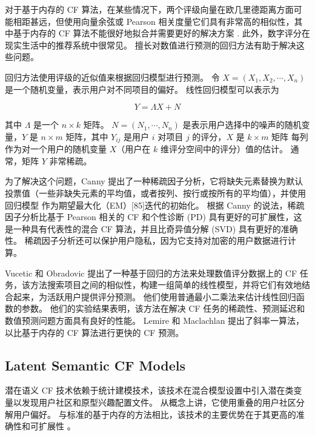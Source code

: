 \documentclass[sigconf]{acmart}
\begin{document}
对于基于内存的 CF 算法，在某些情况下，两个评级向量在欧几里德距离方面可能相距甚远，但使用向量余弦或 Pearson 相关度量它们具有非常高的相似性，其中基于内存的 CF 算法不能很好地拟合并需要更好的解决方案 . 此外，数字评分在现实生活中的推荐系统中很常见。 擅长对数值进行预测的回归方法有助于解决这些问题。

回归方法使用评级的近似值来根据回归模型进行预测。 令 $X = (X_1,X_2, \cdots ,X_n)$ 是一个随机变量，表示用户对不同项目的偏好。 线性回归模型可以表示为

\begin{equation}
  Y=\Lambda X+N
\end{equation}

其中 $\Lambda$ 是一个 $n \times k$ 矩阵。 $N = (N_1, \cdots , N_n)$ 是表示用户选择中的噪声的随机变量，$Y$ 是 $n \times m$ 矩阵，其中 $Y_{ij}$ 是用户 $i$ 对项目 $j$ 的评分，$X$ 是 $k \times m$ 矩阵 每列作为对一个用户的随机变量 $X$（用户在 $k$ 维评分空间中的评分）值的估计。 通常，矩阵 $Y$ 非常稀疏。

为了解决这个问题，Canny \cite{canny2002collaborative} 提出了一种稀疏因子分析，它将缺失元素替换为默认投票值（一些非缺失元素的平均值，或者按列、按行或按所有的平均值），并使用回归模型 作为期望最大化（EM）[85]迭代的初始化。 根据 Canny 的说法，稀疏因子分析比基于 Pearson 相关的 CF 和个性诊断 (PD) 具有更好的可扩展性，这是一种具有代表性的混合 CF 算法，并且比奇异值分解 (SVD) \cite{billsus1998learning} 具有更好的准确性。 稀疏因子分析还可以保护用户隐私，因为它支持对加密的用户数据进行计算。

Vucetic 和 Obradovic \cite{vucetic2005collaborative} 提出了一种基于回归的方法来处理数值评分数据上的 CF 任务，该方法搜索项目之间的相似性，构建一组简单的线性模型，并将它们有效地结合起来，为活跃用户提供评分预测。 他们使用普通最小二乘法来估计线性回归函数的参数。 他们的实验结果表明，该方法在解决 CF 任务的稀疏性、预测延迟和数值预测问题方面具有良好的性能。 Lemire 和 Maclachlan \cite{lemire2005slope} 提出了斜率一算法，以比基于内存的 CF 算法进行更快的 CF 预测。

\subsection{Latent Semantic CF Models}

潜在语义 CF 技术依赖于统计建模技术，该技术在混合模型设置中引入潜在类变量以发现用户社区和原型兴趣配置文件。 从概念上讲，它使用重叠的用户社区分解用户偏好。 与标准的基于内存的方法相比，该技术的主要优势在于其更高的准确性和可扩展性 \cite{hofmann2004latent, hofmann2001unsupervised}。
\end{document}
